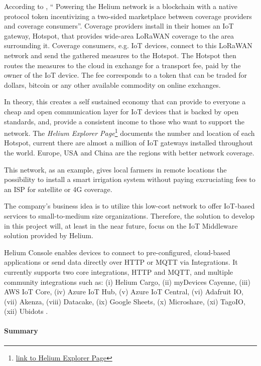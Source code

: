 According to \cite{helium-wp}, `` Powering the Helium network is a blockchain with a native protocol token incentivizing a two-sided marketplace between coverage providers and coverage consumers''. Coverage providers install in their homes an \gls{IoT} gateway, Hotspot, that provides wide-area LoRaWAN coverage to the area surrounding it. Coverage consumers, e.g. \gls{IoT} devices, connect to this LoRaWAN network and send the gathered measures to the Hotspot. The Hotspot then routes the measures to the cloud in exchange for a transport fee, paid by the owner of the \gls{IoT} device.
The fee corresponds to a token that can be traded for dollars, bitcoin or any other available commodity on online exchanges.

In theory, this creates a self sustained economy that can provide to everyone a cheap and open communication layer for \gls{IoT} devices that is backed by open standards, and, provide a consistent income to those who want to support the network. The \textit{Helium Explorer Page}\footnote{\href {https://explorer.helium.com/}{link to Helium Explorer Page}} documents the number and location of each Hotspot, current there are almost a million of \gls{IoT} gateways installed throughout the world. Europe, USA and China are the regions with better network coverage.

This network, as an example, gives local farmers in remote locations the possibility to install a smart irrigation system without paying excruciating fees to an \gls{ISP} for satellite or 4G coverage.

The company's business idea is to utilize this low-cost network to offer \gls{IoT}-based services to small-to-medium size organizations.
Therefore, the solution to develop in this project will, at least in the near future, focus on the \gls{IoT} Middleware solution provided by Helium.

Helium Console enables devices to connect to pre-configured, cloud-based applications or send data directly over HTTP or MQTT via Integrations.
It currently supports two core integrations, HTTP and \gls{MQTT}, and multiple community integrations such as: (i) Helium Cargo, (ii) myDevices Cayenne, (iii) AWS IoT Core, (iv) Azure IoT Hub, (v) Azure IoT Central, (vi) Adafruit IO, (vii) Akenza, (viii) Datacake, (ix) Google Sheets, (x) Microshare, (xi) TagoIO, (xii) Ubidots \parencite{helium-integrations}. 

\paragraph{Summary}
\label{par:stateofart:arch:infra:middleware:summary}

